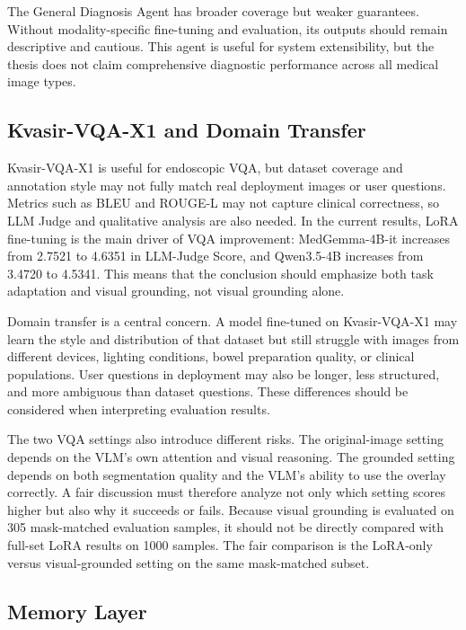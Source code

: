 The General Diagnosis Agent has broader coverage but weaker guarantees. Without modality-specific fine-tuning and evaluation, its outputs should remain descriptive and cautious. This agent is useful for system extensibility, but the thesis does not claim comprehensive diagnostic performance across all medical image types.

\subsection{Kvasir-VQA-X1 and Domain Transfer}

Kvasir-VQA-X1 is useful for endoscopic VQA, but dataset coverage and annotation style may not fully match real deployment images or user questions. Metrics such as BLEU and ROUGE-L may not capture clinical correctness, so LLM Judge and qualitative analysis are also needed. In the current results, LoRA fine-tuning is the main driver of VQA improvement: MedGemma-4B-it increases from 2.7521 to 4.6351 in LLM-Judge Score, and Qwen3.5-4B increases from 3.4720 to 4.5341. This means that the conclusion should emphasize both task adaptation and visual grounding, not visual grounding alone.

Domain transfer is a central concern. A model fine-tuned on Kvasir-VQA-X1 may learn the style and distribution of that dataset but still struggle with images from different devices, lighting conditions, bowel preparation quality, or clinical populations. User questions in deployment may also be longer, less structured, and more ambiguous than dataset questions. These differences should be considered when interpreting evaluation results.

The two VQA settings also introduce different risks. The original-image setting depends on the VLM's own attention and visual reasoning. The grounded setting depends on both segmentation quality and the VLM's ability to use the overlay correctly. A fair discussion must therefore analyze not only which setting scores higher but also why it succeeds or fails. Because visual grounding is evaluated on 305 mask-matched evaluation samples, it should not be directly compared with full-set LoRA results on 1000 samples. The fair comparison is the LoRA-only versus visual-grounded setting on the same mask-matched subset.

\subsection{Memory Layer}

